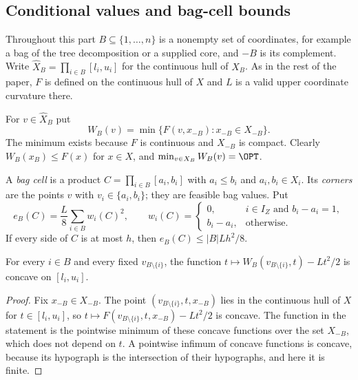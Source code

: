 
\subsection{Conditional values and bag-cell bounds}\label{sec:cr-values}

Throughout this part $B\subseteq\{1,\ldots,n\}$ is a nonempty set of
coordinates, for example a bag of the tree decomposition or a supplied
core, and $-B$ is its complement. Write
$\widehat X_B=\prod_{i\in B}[l_i,u_i]$ for the continuous hull of $X_B$.
As in the rest of the paper, $F$ is defined on the continuous hull of $X$
and $L$ is a valid upper coordinate curvature there.

\begin{definition}\label{def:cr-W}
For $v\in\widehat X_B$ put
\[
W_B(v)=\min\{F(v,x_{-B}) : x_{-B}\in X_{-B}\}.
\]
The minimum exists because $F$ is continuous and $X_{-B}$ is compact.
Clearly $W_B(x_B)\le F(x)$ for $x\in X$, and $\min_{v\in X_B}W_B(v)=\OPT$.
\end{definition}

A \emph{bag cell} is a product $C=\prod_{i\in B}[a_i,b_i]$ with
$a_i\le b_i$ and $a_i,b_i\in X_i$. Its \emph{corners} are the points $v$
with $v_i\in\{a_i,b_i\}$; they are feasible bag values. Put
\[
e_B(C)=\frac L8\sum_{i\in B}w_i(C)^2,\qquad
w_i(C)=\begin{cases}
0,& i\in I_Z\text{ and }b_i-a_i=1,\\
b_i-a_i,&\text{otherwise.}
\end{cases}
\]
If every side of $C$ is at most $h$, then $e_B(C)\le|B|Lh^2/8$.

\begin{lemma}\label{lem:cr-semiconcave}
For every $i\in B$ and every fixed $v_{B\setminus\{i\}}$, the function
$t\mapsto W_B(v_{B\setminus\{i\}},t)-Lt^2/2$ is concave on $[l_i,u_i]$.
\end{lemma}
\begin{proof}
Fix $x_{-B}\in X_{-B}$. The point $(v_{B\setminus\{i\}},t,x_{-B})$ lies in
the continuous hull of $X$ for $t\in[l_i,u_i]$, so
$t\mapsto F(v_{B\setminus\{i\}},t,x_{-B})-Lt^2/2$ is concave. The
function in the statement is the pointwise minimum of these concave
functions over the set $X_{-B}$, which does not depend on $t$. A pointwise
infimum of concave functions is concave, because its hypograph is the
intersection of their hypographs, and here it is finite.
\end{proof}

